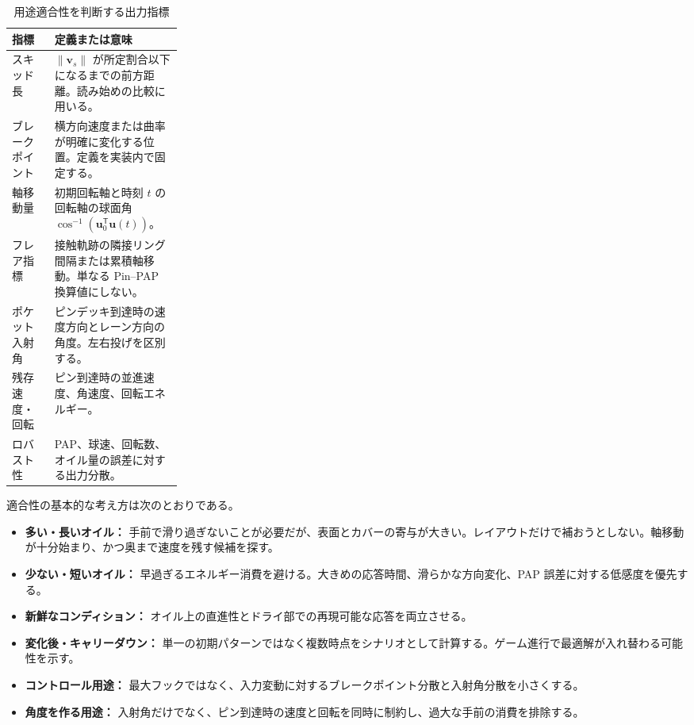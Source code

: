 \documentclass[11pt,a4paper]{article}
\newcommand{\vect}[1]{\bm{#1}}
\begin{document}
\begin{table}[htbp]
\centering
\caption{用途適合性を判断する出力指標}\label{tab:metrics}
\begin{tabularx}{\linewidth}{p{0.25\linewidth}X}
\toprule
指標 & 定義または意味\\
\midrule
スキッド長 & $\|\vect v_s\|$ が所定割合以下になるまでの前方距離。読み始めの比較に用いる。\\
ブレークポイント & 横方向速度または曲率が明確に変化する位置。定義を実装内で固定する。\\
軸移動量 & 初期回転軸と時刻 $t$ の回転軸の球面角 $\cos^{-1}(\vect u_0^{\mathsf T}\vect u(t))$。\\
フレア指標 & 接触軌跡の隣接リング間隔または累積軸移動。単なる Pin--PAP 換算値にしない。\\
ポケット入射角 & ピンデッキ到達時の速度方向とレーン方向の角度。左右投げを区別する。\\
残存速度・回転 & ピン到達時の並進速度、角速度、回転エネルギー。\\
ロバスト性 & PAP、球速、回転数、オイル量の誤差に対する出力分散。\\
\bottomrule
\end{tabularx}
\end{table}

適合性の基本的な考え方は次のとおりである。

\begin{itemize}
  \item \textbf{多い・長いオイル：} 手前で滑り過ぎないことが必要だが、表面とカバーの寄与が大きい。レイアウトだけで補おうとしない。軸移動が十分始まり、かつ奥まで速度を残す候補を探す。
  \item \textbf{少ない・短いオイル：} 早過ぎるエネルギー消費を避ける。大きめの応答時間、滑らかな方向変化、PAP 誤差に対する低感度を優先する。
  \item \textbf{新鮮なコンディション：} オイル上の直進性とドライ部での再現可能な応答を両立させる。
  \item \textbf{変化後・キャリーダウン：} 単一の初期パターンではなく複数時点をシナリオとして計算する。ゲーム進行で最適解が入れ替わる可能性を示す。
  \item \textbf{コントロール用途：} 最大フックではなく、入力変動に対するブレークポイント分散と入射角分散を小さくする。
  \item \textbf{角度を作る用途：} 入射角だけでなく、ピン到達時の速度と回転を同時に制約し、過大な手前の消費を排除する。
\end{itemize}
\end{document}
